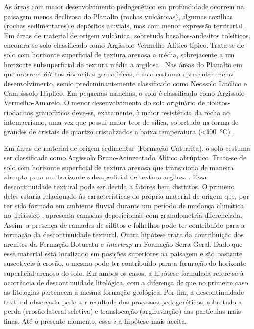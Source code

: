 As áreas com maior desenvolvimento pedogenético em profundidade ocorrem na paisagem menos declivosa do 
Planalto 
(rochas vulcânicas), algumas coxilhas (rochas sedimentares) e depósitos aluviais, mas com menor expressão 
territorial \cite{Miguel2010}. Em áreas de material de origem vulcânica, sobretudo basaltos-andesitos 
toleíticos, encontra-se solo classificado como Argissolo Vermelho Alítico típico. Trata-se de solo com 
horizonte superficial de textura arenosa a média, sobrejacente a um horizonte subsuperficial de textura média 
a 
argilosa \cite{Miguel2010}. Nas áreas do Planalto em que ocorrem riólitos-riodacitos granofíricos, o solo 
costuma apresentar menor desenvolvimento, sendo predominantemente classificado como Neossolo Litólico e 
Cambissolo 
Háplico. Em pequenas manchas, o solo é classificado como Argissolo Vermelho-Amarelo. O menor desenvolvimento 
do 
solo originário de riólitos-riodacitos granofíricos deve-se, exatamente, à maior resistência da rocha ao 
intemperismo, uma vez que possui maior teor de sílica, sobretudo na forma de grandes de cristais de quartzo 
cristalizados a baixa temperatura (\SI{<600}{\celsius}) \cite{Pedron2007}.

Em áreas de material de origem sedimentar (Formação Caturrita), o solo costuma ser classificado como 
Argissolo Bruno-Acinzentado Alítico abrúptico. Trata-se de solo com horizonte superficial de textura arenosa 
que transiciona de maneira abrupta para um horizonte subsuperficial de textura argilosa \cite{Miguel2010}. 
Essa descontinuidade textural pode ser devida a fatores bem distintos. O primeiro deles estaria relacionado às 
características do próprio material de origem que, por ter sido formado em ambiente fluvial durante um período 
de mudança climática no Triássico \cite{PieriniEtAl2002}, apresenta camadas deposicionais com granulometria 
diferenciada. Assim, a presença de camadas de siltitos e folhelhos pode ter contribuído para a formação da 
descontinuidade textural. Outra hipótese trata da contribuição dos arenitos da Formação Botucatu e 
\emph{intertrap} na Formação Serra Geral. Dado que esse material está localizado em posições superiores na 
paisagem e são bastante suscetíveis à erosão, o mesmo pode ter contribuído para a formação do horizonte 
superficial arenoso do solo. Em ambos os casos, a hipótese formulada refere-se à ocorrência de descontinuidade 
litológica, com a diferença de que no primeiro caso as litologias pertencem à mesma formação geológica. Por 
fim, a descontinuidade textural observada pode ser resultado dos processos pedogenéticos, sobretudo a perda 
(erosão lateral seletiva) e translocação (argiluviação) das partículas mais finas. Até o presente momento, 
essa é a hipótese mais aceita.

